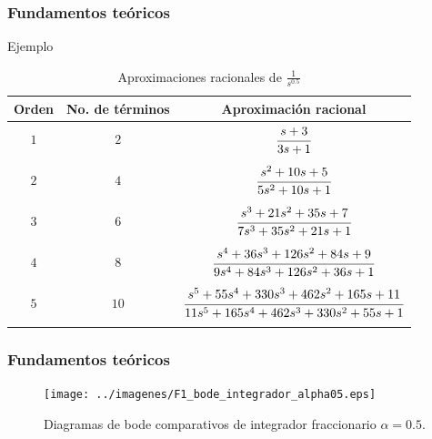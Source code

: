 \documentclass[10pt]{beamer}
\begin{document}
	\begin{frame}
		\frametitle{Fundamentos teóricos}
		\begin{block}{Ejemplo}
			\begin{scriptsize}
			\begin{table}[!hbp]
		\caption{Aproximaciones racionales de $\frac{1}{s^{0.5}}$}
		\label{tab:aprox_cfe_alpha_0.5}
		\centering
		\begin{tabular}{c c c}
			\hline
			\textbf{Orden} &  \textbf{No. de términos} & \textbf{Aproximación racional}\\
			\hline
			$1$ 		& $2$ 		&  $\cfrac{s + 3}{3s + 1}$\\
					 		& 		 		& \\
			$2$			& $4$ 		&  $\cfrac{s^{2} + 10s + 5}{5 s^{2} + 10s + 1}$\\
							& 		 		& \\
			$3$ 		& $6$ 		&  $\cfrac{s^{3} + 21s^{2} + 35s + 7}{7 s^3 + 35 s^2 + 21 s + 1}$	\\
							& 		 		& \\
			$4$ 		& $8$ 		&  $\cfrac{s^4 + 36 s^3 + 126 s^2 + 84 s + 9}{9 s^4 + 84 s^3 + 126 s^2 + 36 s + 1}$\\
							& 		 		& \\
			$5$ 		& $10$ 		&  $\cfrac{s^5 + 55 s^4 + 330 s^3 + 462 s^2 + 165 s + 11}{11 s^5 + 165 s^4 + 462 s^3 + 330 s^2 + 55 s + 1}$\\
							& 		 		& \\
			\hline
		\end{tabular}
	\end{table}
			\end{scriptsize}
		\end{block}
	\end{frame}	
	\begin{frame}
		\frametitle{Fundamentos teóricos}
		\begin{figure}[hbtp]
			\caption{Diagramas de bode comparativos de integrador fraccionario $\alpha = 0.5$.} 
			\label{fig:F1_bode_integrador_alpha05}
			\centering
			\texttt{[image: ../imagenes/F1\_bode\_integrador\_alpha05.eps]}
		\end{figure}	
	\end{frame}
\end{document}
